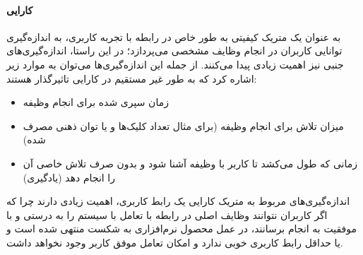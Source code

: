 \paragraph{کارایی}
به عنوان یک متریک کیفیتی به طور خاص در رابطه با تجربه کاربری، به اندازه‌گیری توانایی کاربران در انجام وظایف مشخصی می‌پردازد؛ در این راستا، اندازه‌گیری‌های جنبی نیز اهمیت زیادی پیدا می‌کنند. از جمله این اندازه‌گیری‌ها می‌توان به موارد زیر اشاره کرد که به طور غیر مستقیم در کارایی تاثیرگذار هستند:
\begin{itemize}
	\item 
	زمان سپری شده برای انجام وظیفه
	\item 
	میزان تلاش برای انجام وظیفه (برای مثال تعداد کلیک‌ها و یا توان ذهنی مصرف شده)
	\item 
	زمانی که طول می‌کشد تا کاربر با وظیفه آشنا شود و بدون صرف تلاش خاصی آن را انجام دهد (یادگیری)
\end{itemize}
اندازه‌گیری‌های مربوط به متریک کارایی یک رابط کاربری، اهمیت زیادی دارند چرا که اگر کاربران نتوانند وظایف اصلی در رابطه با تعامل با سیستم را به درستی و با موفقیت به انجام برسانند، در عمل محصول نرم‌افزاری به شکست منتهی شده است و یا حداقل رابط کاربری خوبی ندارد و امکان تعامل موفق کاربر وجود نخواهد داشت.

